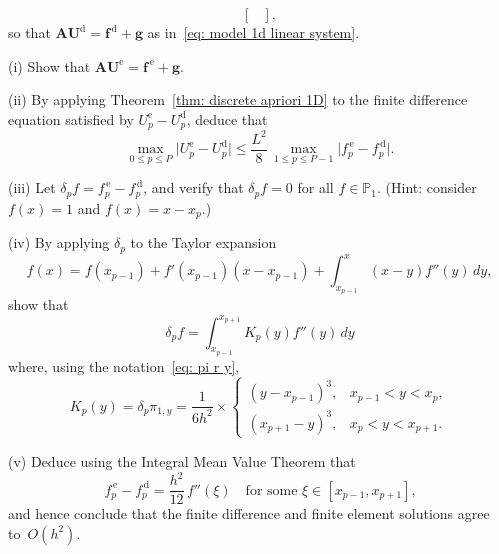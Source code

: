\begin{Exercises}
\[\begin{bmatrix}
\end{bmatrix},
\]
so that $\boldsymbol{A}\boldsymbol{U}^{\mathrm{d}}=\boldsymbol{f}^{\,\mathrm{d}}
+\boldsymbol{g}$ as in~\eqref{eq: model 1d linear system}.
\begin{description}
\item{(i)} Show that $\boldsymbol{A}\boldsymbol{U}^{\mathrm{e}}
=\boldsymbol{f}^{\,\mathrm{e}}+\boldsymbol{g}$.
\item{(ii)} By applying Theorem~\ref{thm: discrete apriori 1D} to the finite 
difference equation satisfied by $U^{\mathrm{e}}_p-U^{\mathrm{d}}_p$, deduce 
that
\[
\max_{0\le p\le P}\bigl|U^{\mathrm{e}}_p-U^{\mathrm{d}}_p\bigr|
    \le\frac{L^2}{8}\,\max_{1\le p\le P-1}
    \bigl|f^{\,\mathrm{e}}_p-f^{\,\mathrm{d}}_p\bigr|.
\]
\item{(iii)}
Let $\delta_pf=f^{\,\mathrm{e}}_p-f^{\,\mathrm{d}}_p$, and
verify that $\delta_pf=0$ for all $f\in\mathbb{P}_1$.
(Hint: consider $f(x)=1$ and $f(x)=x-x_p$.)
\item{(iv)}
By applying $\delta_p$ to the Taylor expansion
\[
f(x)=f(x_{p-1})+f'(x_{p-1})(x-x_{p-1})+\int_{x_{p-1}}^x
	(x-y)f''(y)\,dy,
\]
show that 
\[
\delta_pf=\int_{x_{p-1}}^{x_{p+1}} K_p(y)f''(y)\,dy
\]
where, using the notation~\eqref{eq: pi r y},
\[
K_p(y)=\delta_p\pi_{1,y}=\frac{1}{6h^2}\times\begin{cases}
        (y-x_{p-1})^3,&x_{p-1}<y<x_p,\\
        (x_{p+1}-y)^3,&x_p<y<x_{p+1}.
\end{cases}
\]
\item{(v)}
Deduce using the Integral Mean Value Theorem that
\[
f^{\,\mathrm{e}}_p-f^{\,\mathrm{d}}_p=\frac{h^2}{12}\,f''(\xi)
\quad\text{for some $\xi\in[x_{p-1},x_{p+1}]$,}
\]
and hence conclude that the finite difference and finite element solutions 
agree to~$O(h^2)$.
\end{description}


\end{Exercises}

